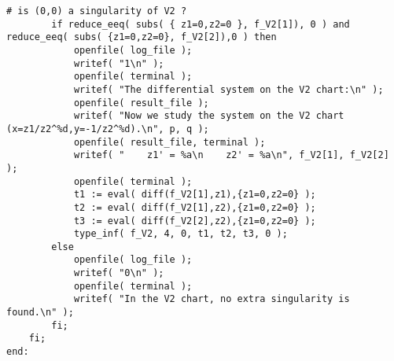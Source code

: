 \documentclass[a4paper,10pt]{article}
\begin{document}
\begin{lstlisting}[name=infinity]
        # is (0,0) a singularity of V2 ?
        if reduce_eeq( subs( { z1=0,z2=0 }, f_V2[1]), 0 ) and reduce_eeq( subs( {z1=0,z2=0}, f_V2[2]),0 ) then
            openfile( log_file );
            writef( "1\n" );
            openfile( terminal );
            writef( "The differential system on the V2 chart:\n" );
            openfile( result_file );
            writef( "Now we study the system on the V2 chart (x=z1/z2^%d,y=-1/z2^%d).\n", p, q );
            openfile( result_file, terminal );
            writef( "    z1' = %a\n    z2' = %a\n", f_V2[1], f_V2[2] );
            openfile( terminal );
            t1 := eval( diff(f_V2[1],z1),{z1=0,z2=0} );
            t2 := eval( diff(f_V2[1],z2),{z1=0,z2=0} );
            t3 := eval( diff(f_V2[2],z2),{z1=0,z2=0} );
            type_inf( f_V2, 4, 0, t1, t2, t3, 0 );
        else
            openfile( log_file );
            writef( "0\n" );
            openfile( terminal );
            writef( "In the V2 chart, no extra singularity is found.\n" );
        fi;
    fi;
end:
\end{lstlisting}
\end{document}
